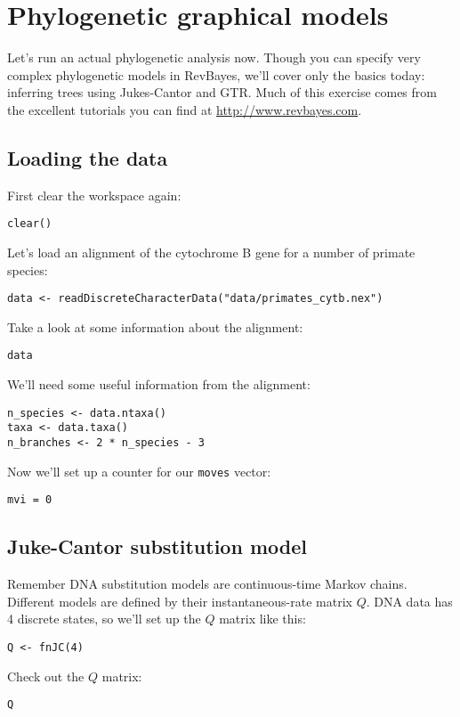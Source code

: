 \documentclass[11pt]{article}
\begin{document}
\section{Phylogenetic graphical models}

Let's run an actual phylogenetic analysis now. 
Though you can specify very complex phylogenetic models
in RevBayes, we'll cover only the basics today:
inferring trees using Jukes-Cantor and GTR.
Much of this exercise comes from the excellent
tutorials you can find at \url{http://www.revbayes.com}.

\subsection{Loading the data}

First clear the workspace again:
\begin{verbatim}
clear()
\end{verbatim}
Let's load an alignment of the cytochrome B gene for a number
of primate species:
\begin{verbatim}
data <- readDiscreteCharacterData("data/primates_cytb.nex")
\end{verbatim}
Take a look at some information about the alignment:
\begin{verbatim}
data
\end{verbatim}
We'll need some useful information from the alignment:
\begin{verbatim}
n_species <- data.ntaxa()
taxa <- data.taxa()
n_branches <- 2 * n_species - 3
\end{verbatim}
Now we'll set up a counter for our \texttt{moves} vector:
\begin{verbatim}
mvi = 0
\end{verbatim}

\subsection{Juke-Cantor substitution model}

Remember DNA substitution models are continuous-time Markov chains.
Different models are defined by their instantaneous-rate matrix $Q$.
DNA data has 4 discrete states, so we'll set up the $Q$ matrix like this:
\begin{verbatim}
Q <- fnJC(4)
\end{verbatim}
Check out the $Q$ matrix:
\begin{verbatim}
Q
\end{verbatim}
\end{document}
